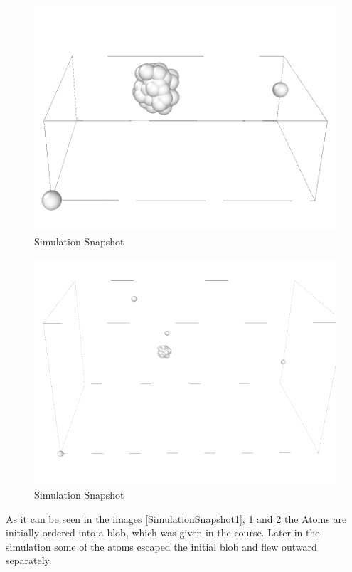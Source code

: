 \begin{figure}
	\begin{center}
		\includegraphics[scale= 0.75]{Figure/2ImageS.png}
	\end{center}
	\caption[Simulation Snapshot]{Simulation Snapshot }
	\label{SimulationSnapshot2}
\end{figure}

\begin{figure}
	\begin{center}
		\includegraphics[scale= 0.65]{Figure/3ImageS.png}
	\end{center}
	\caption[Simulation Snapshot]{Simulation Snapshot }
	\label{SimulationSnapshot3}
\end{figure}
As it can be seen in the images \ref{SimulationSnapshot1}, \ref{SimulationSnapshot2} and \ref{SimulationSnapshot3} the Atoms are initially ordered into a blob, which was given in the course. 
Later in the simulation some of the atoms escaped the initial blob and flew outward separately. 
